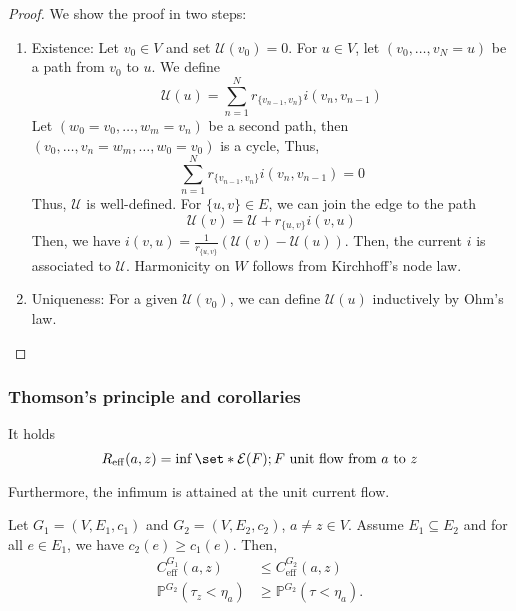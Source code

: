 \begin{proof}
    We show the proof in two steps:
    \begin{enumerate}[]
      \item Existence: Let \(v_0\in V\) and set \(\mathcal{U}(v_0)=0\). For \(u\in V\), let \((v_0,\dots, v_N=u)\) be a path from \(v_0\) to \(u\). We define \[\mathcal{U}(u)=\sum_{n=1}^{N}r_{\{v_{n-1},v_{n}\}}i(v_{n}, v_{n-1}) \]
        Let \((w_0=v_0, \dots, w_m=v_n)\) be a second path, then \((v_0, \dots, v_n=w_m, \dots, w_0=v_0)\) is a cycle, Thus, 
        \[\sum_{n=1}^{N} r_{\{v_{n-1},v_n\}} i(v_{n},v_{n-1})=0 \]
        Thus, \(\mathcal{U}\) is well-defined. For \(\{u,v\} \in E\), we can join the edge to the path \[\mathcal{U}(v) = \mathcal{U}+r_{\{u,v\}}i(v,u)\]
        Then, we have \(i(v,u) = \frac{1}{r_{\{u,v\}}} \left(\mathcal{U}(v)-\mathcal{U}(u)\right)\). Then, the current \(i\) is associated to \(\mathcal{U}\). Harmonicity on \(W\) follows from Kirchhoff's node law.
      \item Uniqueness: For a given \(\mathcal{U}(v_0)\), we can define \(\mathcal{U}(u)\) inductively by Ohm's law. 
    \end{enumerate}
    
\end{proof}


\subsubsection{Thomson's principle and corollaries}

\begin{thm}
    It holds 
    \[R_{\mathrm{eff}}(a,z) = \inf_{} \set*{\mathcal{E}(F); F \text{ unit flow from \(a\) to \(z\)}}\]
    Furthermore, the infimum is attained at the unit current flow.
\end{thm}


\begin{corl}[]
    Let \(G_1=(V,E_1,c_1)\) and \(G_2=(V,E_2,c_2)\), \(a\neq z \in V\). Assume \(E_1 \subseteq E_2\) and for all \(e \in  E_1\), we have \(c_2(e) \geq c_1(e)\). Then,
    \begin{align*}
      C_{\mathrm{eff}}^{G_1}(a,z)&\leq C_{\mathrm{eff}}^{G_2}(a,z)\\
      \mathbb{P}^{G_2}(\tau_z<\eta_a) & \geq \mathbb{P}^{G_2}(\tau <\eta_a).
    \end{align*}
\end{corl}


